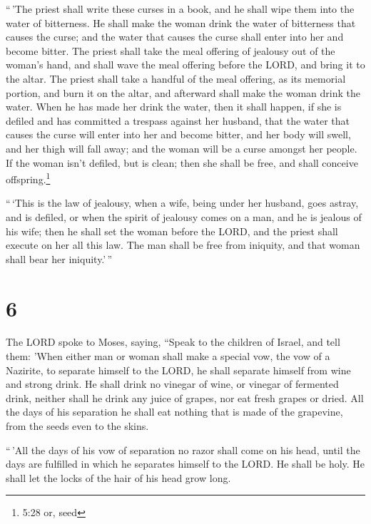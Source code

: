  ``\,'The priest shall write these curses in a book, and he
shall wipe them into the water of bitterness.  He shall
make the woman drink the water of bitterness that causes the curse; and
the water that causes the curse shall enter into her and become bitter.
 The priest shall take the meal offering of jealousy out of
the woman's hand, and shall wave the meal offering before the LORD, and
bring it to the altar.  The priest shall take a handful of
the meal offering, as its memorial portion, and burn it on the altar,
and afterward shall make the woman drink the water.  When
he has made her drink the water, then it shall happen, if she is defiled
and has committed a trespass against her husband, that the water that
causes the curse will enter into her and become bitter, and her body
will swell, and her thigh will fall away; and the woman will be a curse
amongst her people.  If the woman isn't defiled, but is
clean; then she shall be free, and shall conceive offspring.\footnote{5:28
  or, seed}

 ``\,`This is the law of jealousy, when a wife, being under
her husband, goes astray, and is defiled,  or when the
spirit of jealousy comes on a man, and he is jealous of his wife; then
he shall set the woman before the LORD, and the priest shall execute on
her all this law.  The man shall be free from iniquity, and
that woman shall bear her iniquity.'\,''

\hypertarget{section-5}{%
\section{6}\label{section-5}}

 The LORD spoke to Moses, saying,  ``Speak to
the children of Israel, and tell them: 'When either man or woman shall
make a special vow, the vow of a Nazirite, to separate himself to the
LORD,  he shall separate himself from wine and strong drink.
He shall drink no vinegar of wine, or vinegar of fermented drink,
neither shall he drink any juice of grapes, nor eat fresh grapes or
dried.  All the days of his separation he shall eat nothing
that is made of the grapevine, from the seeds even to the skins.

 ``\,'All the days of his vow of separation no razor shall
come on his head, until the days are fulfilled in which he separates
himself to the LORD. He shall be holy. He shall let the locks of the
hair of his head grow long.

